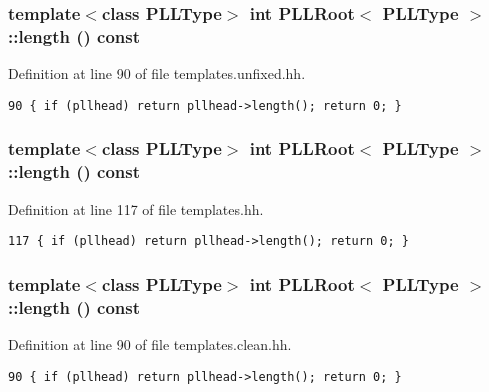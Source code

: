 \subsubsection{\setlength{\rightskip}{0pt plus 5cm}template$<$class PLLType$>$ int PLLRoot$<$ {\bf PLLType} $>$::length () const\hspace{0.3cm}{\tt  [inline]}}\label{classPLLRoot_a57}




Definition at line 90 of file templates.unfixed.hh.



\footnotesize\begin{verbatim}90 { if (pllhead) return pllhead->length(); return 0; } 
\end{verbatim}\normalsize 
{}
\subsubsection{\setlength{\rightskip}{0pt plus 5cm}template$<$class PLLType$>$ int PLLRoot$<$ {\bf PLLType} $>$::length () const\hspace{0.3cm}{\tt  [inline]}}\label{classPLLRoot_a40}




Definition at line 117 of file templates.hh.



\footnotesize\begin{verbatim}117 { if (pllhead) return pllhead->length(); return 0; } 
\end{verbatim}\normalsize 
{}
\subsubsection{\setlength{\rightskip}{0pt plus 5cm}template$<$class PLLType$>$ int PLLRoot$<$ {\bf PLLType} $>$::length () const\hspace{0.3cm}{\tt  [inline]}}\label{classPLLRoot_a23}




Definition at line 90 of file templates.clean.hh.



\footnotesize\begin{verbatim}90 { if (pllhead) return pllhead->length(); return 0; } 
\end{verbatim}\normalsize 
{}
